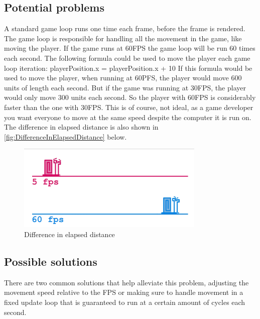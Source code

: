 \documentclass{article} %
\begin{document}
\subsection{Potential problems}
A standard game loop runs one time each frame, before the frame is rendered.
The game loop is responsible for handling all the movement in the game, like moving the player.
If the game runs at 60FPS the game loop will be run 60 times each second.
\newline\newline
The following formula could be used to move the player each game loop iteration:
\newline
playerPosition.x = playerPosition.x + 10
\newline\newline
If this formula would be used to move the player, when running at 60PFS, the player would move 600 units of length each second.
But if the game was running at 30FPS, the player would only move 300 units each second.
So the player with 60FPS is considerably faster than the one with 30FPS.
This is of course, not ideal, as a game developer you want everyone to move at the same speed despite the computer it is run on.
The difference in elapsed distance is also shown in \autoref{fig:DifferenceInElapsedDistance} below.
\begin{figure}[h!]
	\centering
	\includegraphics[width=0.8\textwidth]{difference_in_distance.png}
	\caption{Difference in elapsed distance}
	\label{fig:DifferenceInElapsedDistance}
\end{figure}

\subsection{Possible solutions}
There are two common solutions that help alleviate this problem, adjusting the movement speed relative to the FPS or making sure to handle movement in a fixed update loop that is guaranteed to run at a certain amount of cycles each second.
\end{document}

